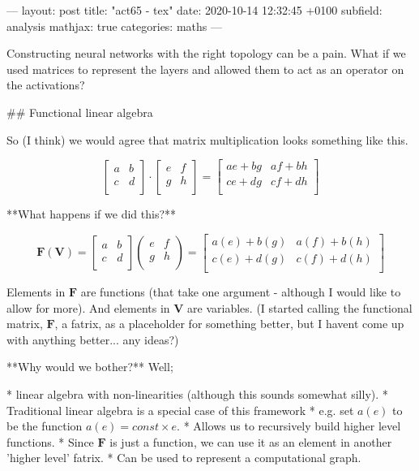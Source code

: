 ---
layout: post
title:  "act65 - tex"
date:   2020-10-14 12:32:45 +0100
subfield: analysis
mathjax: true
categories: maths
---

Constructing neural networks with the right topology can be a pain. What if we used matrices to represent the layers and allowed them to act as an operator on the activations?

## Functional linear algebra

So (I think) we would agree that matrix multiplication looks something like this.

$$
\begin{bmatrix}
a & b\\
c & d\\
\end{bmatrix}
\cdot
\begin{bmatrix}
e & f\\
g & h\\
\end{bmatrix}
=
\begin{bmatrix}
ae+bg & af+bh\\
ce+dg & cf+dh\\
\end{bmatrix}
$$


**What happens if we did this?**


$$
\textbf{F}(\textbf{V}) =
\begin{bmatrix}
a & b\\
c & d\\
\end{bmatrix}
\begin{pmatrix}
e & f\\
g & h\\
\end{pmatrix}=
\begin{bmatrix}
a(e)+b(g) & a(f)+b(h)\\
c(e)+d(g) & c(f)+d(h)\\
\end{bmatrix}
$$

Elements in $\textbf{F}$ are functions (that take one argument - although I would like to allow for more). And elements in $\textbf{V}$ are variables. (I started calling the functional matrix, $\textbf{F}$, a fatrix, as a placeholder for something better, but I havent come up with anything better... any ideas?)

**Why would we bother?** Well;

* linear algebra with non-linearities (although this sounds somewhat silly).
* Traditional linear algebra is a special case of this framework
    * e.g. set $a(e)$ to be the function $a(e) = const\times e$.
* Allows us to recursively build higher level functions.
    * Since $\textbf{F}$ is just a function, we can use it as an element in another 'higher level' fatrix.
* Can be used to represent a computational graph.


